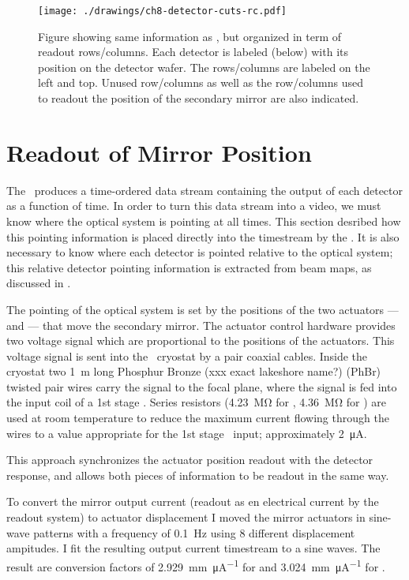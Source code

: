 \begin{figure}
\centering
\texttt{[image: ./drawings/ch8-detector-cuts-rc.pdf]}
\caption{Figure showing same information as , but organized in term of readout rows/columns. Each detector is labeled (below) with its position on the detector wafer. The rows/columns are labeled on the left and top. Unused row/columns as well as the row/columns used to readout the position of the secondary mirror are also indicated. }
\label{fig:detector-cuts-rc}
\end{figure}

\section{Readout of Mirror Position}\label{sec:ch8-mirror-readout}

The \Imager\ produces a time-ordered data stream containing the output of each detector as a function of time.
In order to turn this data stream into a video, we must know where the optical system is pointing at all times.
This section desribed how this pointing information is placed directly into the timestream by the \Imager.
It is also necessary to know where each detector is pointed relative to the optical system; this relative detector pointing information is extracted from beam maps, as discussed in .

The pointing of the optical system is set by the positions of the two actuators ---  and  --- that move the secondary mirror.
The actuator control hardware provides two voltage signal which are proportional to the positions of the actuators.
This voltage signal is sent into the \Imager\ cryostat by a pair coaxial cables.
Inside the cryostat two \SI{1}{m} long Phosphur Bronze (xxx exact lakeshore name?) (PhBr)  twisted pair wires carry the signal to the focal plane, where the signal is fed into the input coil of a 1st stage \SQUID.
Series resistors (\SI{4.23}{\mega\ohm} for , \SI{4.36}{\mega\ohm} for ) are used at room temperature to reduce the maximum current flowing through the wires to a value appropriate for the 1st stage \SQUID\ input; approximately \SI{2}{\uA}.

This approach synchronizes the actuator position readout with the detector response, and allows both pieces of information to be readout in the same way.

To convert the mirror output current (readout as en electrical current by the readout system) to actuator displacement I moved the mirror actuators in sine-wave patterns with a frequency of \SI{0.1}{\Hz} using 8 different displacement ampitudes.
I fit the resulting output current timestream to a sine waves.
The result are conversion factors of \SI{2.929}{\mm\per\uA} for  and \SI{3.024}{\mm\per\uA} for .

